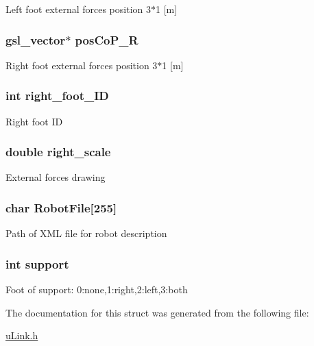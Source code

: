 Left foot external forces position 3$\ast$1 \mbox{[}m\mbox{]} \hypertarget{struct_state_afc53045e2ea4e9521ec9608a84ee8b1f}{
\subsubsection[{pos\-Co\-P\-\_\-\-R}]{\setlength{\rightskip}{0pt plus 5cm}gsl\-\_\-vector$\ast$ pos\-Co\-P\-\_\-\-R}}\label{struct_state_afc53045e2ea4e9521ec9608a84ee8b1f}
Right foot external forces position 3$\ast$1 \mbox{[}m\mbox{]} \hypertarget{struct_state_a412b58628ab2f6728a48e833b58afa71}{
\subsubsection[{right\-\_\-foot\-\_\-\-I\-D}]{\setlength{\rightskip}{0pt plus 5cm}int right\-\_\-foot\-\_\-\-I\-D}}\label{struct_state_a412b58628ab2f6728a48e833b58afa71}
Right foot I\-D \hypertarget{struct_state_a14b89c1ada80dbb1e2318987479bcccb}{
\subsubsection[{right\-\_\-scale}]{\setlength{\rightskip}{0pt plus 5cm}double right\-\_\-scale}}\label{struct_state_a14b89c1ada80dbb1e2318987479bcccb}
External forces drawing \hypertarget{struct_state_a56f05fd9f431f5460c0cd19f7b6113d5}{
\subsubsection[{Robot\-File}]{\setlength{\rightskip}{0pt plus 5cm}char Robot\-File\mbox{[}255\mbox{]}}}\label{struct_state_a56f05fd9f431f5460c0cd19f7b6113d5}
Path of X\-M\-L file for robot description \hypertarget{struct_state_ae8470b9dfef111e0d72a983ce72e4c9c}{
\subsubsection[{support}]{\setlength{\rightskip}{0pt plus 5cm}int support}}\label{struct_state_ae8470b9dfef111e0d72a983ce72e4c9c}
Foot of support\-: 0\-:none,1\-:right,2\-:left,3\-:both 

The documentation for this struct was generated from the following file\-:\begin{DoxyCompactItemize}
\item 
\hyperlink{u_link_8h}{u\-Link.\-h}\end{DoxyCompactItemize}
